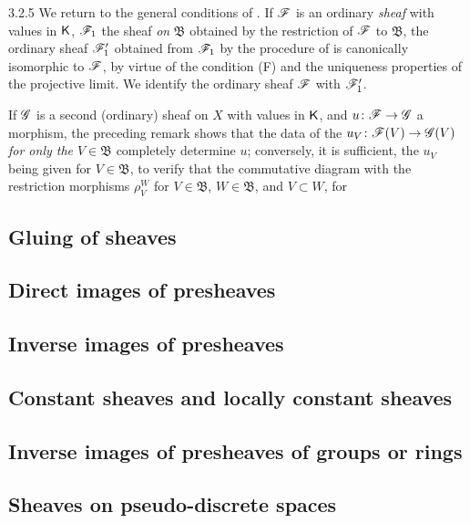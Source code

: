 \documentclass{book}
\begin{document}
\begin{env}{3.2.5}
\label{env-0.3.2.5}
We return to the general conditions of . If $\mathscr{F}$ is an ordinary
\emph{sheaf} with values in $\mathsf{K}$, $\mathscr{F}_1$ the sheaf \emph{on} $\mathfrak{B}$ obtained
by the restriction of $\mathscr{F}$ to $\mathfrak{B}$, the ordinary sheaf $\mathscr{F}_1'$
obtained from $\mathscr{F}_1$ by the procedure of  is canonically
isomorphic to $\mathscr{F}$, by virtue of the condition (F) and the uniqueness properties
of the projective limit. We identify the ordinary sheaf $\mathscr{F}$ with $\mathscr{F}_1'$.

If $\mathscr{G}$ is a second (ordinary) sheaf on $X$ with values in $\mathsf{K}$, and
$u\colon\mathscr{F}\to\mathscr{G}$ a morphism, the preceding remark shows that the data of
the $u_V\colon\mathscr{F}(V)\to\mathscr{G}(V)$ \emph{for only the $V\in\mathfrak{B}$} completely
determine $u$; conversely, it is sufficient, the $u_V$ being given for $V\in\mathfrak{B}$,
to verify that the commutative diagram with the restriction morphisms $\rho_V^W$ for
$V\in\mathfrak{B}$, $W\in\mathfrak{B}$, and $V\subset W$, for
\end{env}

\subsection{Gluing of sheaves}
\label{0-prelim-3.3}

\subsection{Direct images of presheaves}
\label{0-prelim-3.4}

\subsection{Inverse images of presheaves}
\label{0-prelim-3.5}

\subsection{Constant sheaves and locally constant sheaves}
\label{0-prelim-3.6}

\subsection{Inverse images of presheaves of groups or rings}
\label{0-prelim-3.7}

\subsection{Sheaves on pseudo-discrete spaces}
\label{0-prelim-3.8}
\end{document}
